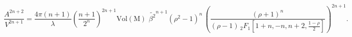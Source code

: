 \begin{equation}
\frac{A^{2n+2}}{V^{2n+1}}=\frac{4\pi(n+1)}{\lambda}\left(\frac{n+1}{2^n}
 \right)^{2n+1}\mathrm{Vol(M)}\, \,\tilde{\beta^2}^{n+1}(\rho^2-1)^n\,
 \left(\frac{(\rho+1)^n}{(\rho-1)\,_2F_{1}[1+n,-n,n+2,\frac{1-\rho}{2}]
 } \right)^{2n+1}.
\end{equation}

